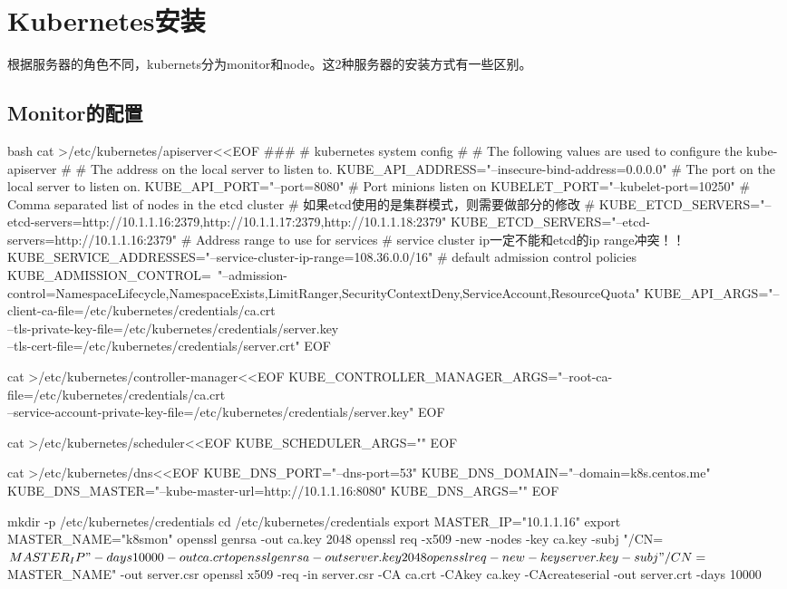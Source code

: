 \section{Kubernetes安装}
根据服务器的角色不同，kubernets分为monitor和node。这2种服务器的安装方式有一些区别。

\subsection{Monitor的配置}
\begin{code-block}{bash}
cat >/etc/kubernetes/apiserver<<EOF
###
# kubernetes system config
#
# The following values are used to configure the kube-apiserver
#
# The address on the local server to listen to.
KUBE_API_ADDRESS="--insecure-bind-address=0.0.0.0"
# The port on the local server to listen on.
KUBE_API_PORT="--port=8080"
# Port minions listen on
KUBELET_PORT="--kubelet-port=10250"
# Comma separated list of nodes in the etcd cluster
# 如果etcd使用的是集群模式，则需要做部分的修改
# KUBE_ETCD_SERVERS="--etcd-servers=http://10.1.1.16:2379,http://10.1.1.17:2379,http://10.1.1.18:2379"
KUBE_ETCD_SERVERS="--etcd-servers=http://10.1.1.16:2379"
# Address range to use for services
# service cluster ip一定不能和etcd的ip range冲突！！
KUBE_SERVICE_ADDRESSES="--service-cluster-ip-range=108.36.0.0/16"
# default admission control policies
KUBE_ADMISSION_CONTROL=\
"--admission-control=NamespaceLifecycle,NamespaceExists,LimitRanger,SecurityContextDeny,ServiceAccount,ResourceQuota"
KUBE_API_ARGS="--client-ca-file=/etc/kubernetes/credentials/ca.crt \\
               --tls-private-key-file=/etc/kubernetes/credentials/server.key \\
               --tls-cert-file=/etc/kubernetes/credentials/server.crt"
EOF

cat >/etc/kubernetes/controller-manager<<EOF
KUBE_CONTROLLER_MANAGER_ARGS="--root-ca-file=/etc/kubernetes/credentials/ca.crt \\
    --service-account-private-key-file=/etc/kubernetes/credentials/server.key"
EOF

cat >/etc/kubernetes/scheduler<<EOF
KUBE_SCHEDULER_ARGS=""
EOF

cat >/etc/kubernetes/dns<<EOF
KUBE_DNS_PORT="--dns-port=53"
KUBE_DNS_DOMAIN="--domain=k8s.centos.me"
KUBE_DNS_MASTER="--kube-master-url=http://10.1.1.16:8080"
KUBE_DNS_ARGS=""
EOF

mkdir -p /etc/kubernetes/credentials
cd /etc/kubernetes/credentials
export MASTER_IP="10.1.1.16"
export MASTER_NAME="k8smon"
openssl genrsa -out ca.key 2048
openssl req -x509 -new -nodes -key ca.key -subj "/CN=${MASTER_IP}" -days 10000 -out ca.crt
openssl genrsa -out server.key 2048
openssl req -new -key server.key -subj "/CN=${MASTER_NAME}" -out server.csr
openssl x509 -req -in server.csr -CA ca.crt -CAkey ca.key -CAcreateserial -out server.crt -days 10000


\end{code-block}

